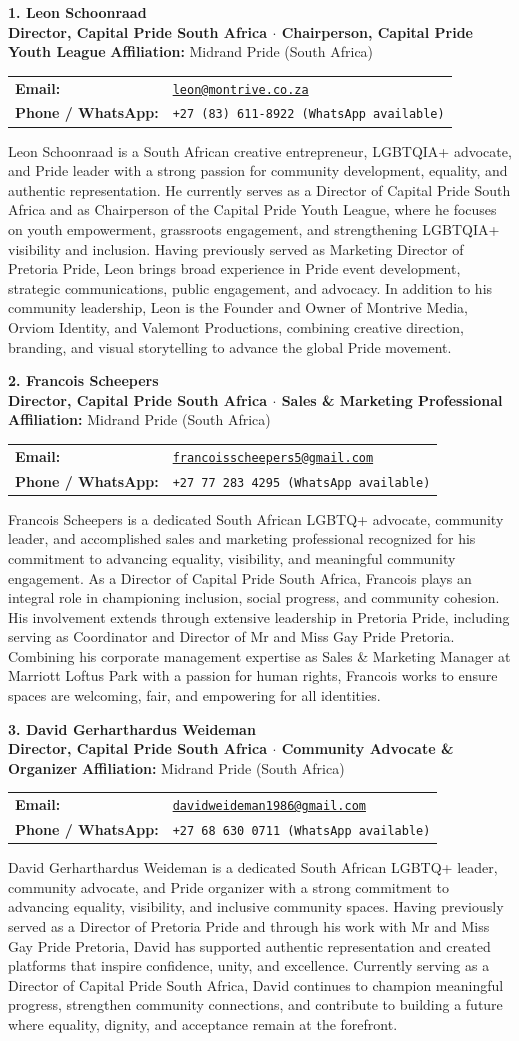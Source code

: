 \documentclass[10pt,a4paper]{article}
\makeatletter
\newcommand{\ombudsperson}[6]{
    \noindent
    \begin{minipage}{\linewidth}
        \vspace{2mm}
        {\Large\bfseries\color{primary} #1}\\[1mm]
        {\normalsize\bfseries\color{secondary} #2} \hfill {\footnotesize\textbf{Affiliation:} #3}\\[1.5mm]
        \begin{tabularx}{\linewidth}{@{}lX@{}}
            \textbf{\footnotesize Email:} & \href{mailto:#4}{\small\texttt{#4}} \\
            \textbf{\footnotesize Phone / WhatsApp:} & \small\texttt{#5} \\
        \end{tabularx}
        \vspace{1.5mm}
        
        \noindent\small #6
        \vspace{3mm}
        \noindent{\color{bordergray}\hrule height 0.6pt}
    \end{minipage}
}
\makeatother
\begin{document}
\ombudsperson{1. Leon Schoonraad}%
{Director, Capital Pride South Africa $\cdot$ Chairperson, Capital Pride Youth League}%
{Midrand Pride (South Africa)}%
{leon@montrive.co.za}%
{+27 (83) 611-8922 (WhatsApp available)}%
{Leon Schoonraad is a South African creative entrepreneur, LGBTQIA+ advocate, and Pride leader with a strong passion for community development, equality, and authentic representation. He currently serves as a Director of Capital Pride South Africa and as Chairperson of the Capital Pride Youth League, where he focuses on youth empowerment, grassroots engagement, and strengthening LGBTQIA+ visibility and inclusion. Having previously served as Marketing Director of Pretoria Pride, Leon brings broad experience in Pride event development, strategic communications, public engagement, and advocacy. In addition to his community leadership, Leon is the Founder and Owner of Montrive Media, Orviom Identity, and Valemont Productions, combining creative direction, branding, and visual storytelling to advance the global Pride movement.}

\ombudsperson{2. Francois Scheepers}%
{Director, Capital Pride South Africa $\cdot$ Sales \& Marketing Professional}%
{Midrand Pride (South Africa)}%
{francoisscheepers5@gmail.com}%
{+27 77 283 4295 (WhatsApp available)}%
{Francois Scheepers is a dedicated South African LGBTQ+ advocate, community leader, and accomplished sales and marketing professional recognized for his commitment to advancing equality, visibility, and meaningful community engagement. As a Director of Capital Pride South Africa, Francois plays an integral role in championing inclusion, social progress, and community cohesion. His involvement extends through extensive leadership in Pretoria Pride, including serving as Coordinator and Director of Mr and Miss Gay Pride Pretoria. Combining his corporate management expertise as Sales \& Marketing Manager at Marriott Loftus Park with a passion for human rights, Francois works to ensure spaces are welcoming, fair, and empowering for all identities.}

\newpage

\ombudsperson{3. David Gerharthardus Weideman}%
{Director, Capital Pride South Africa $\cdot$ Community Advocate \& Organizer}%
{Midrand Pride (South Africa)}%
{davidweideman1986@gmail.com}%
{+27 68 630 0711 (WhatsApp available)}%
{David Gerharthardus Weideman is a dedicated South African LGBTQ+ leader, community advocate, and Pride organizer with a strong commitment to advancing equality, visibility, and inclusive community spaces. Having previously served as a Director of Pretoria Pride and through his work with Mr and Miss Gay Pride Pretoria, David has supported authentic representation and created platforms that inspire confidence, unity, and excellence. Currently serving as a Director of Capital Pride South Africa, David continues to champion meaningful progress, strengthen community connections, and contribute to building a future where equality, dignity, and acceptance remain at the forefront.}
\end{document}
